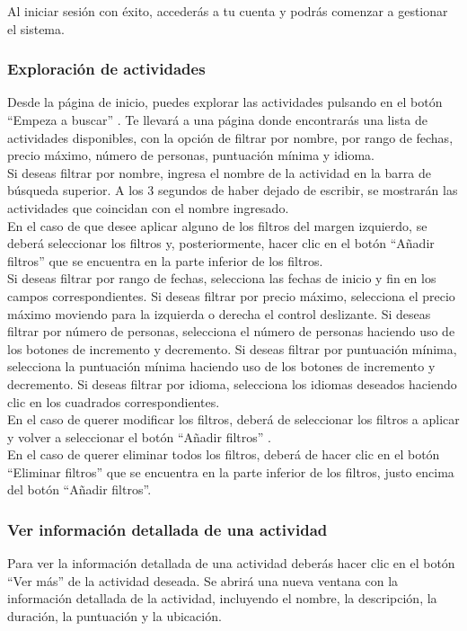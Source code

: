 Al iniciar sesión con éxito, accederás a tu cuenta y podrás comenzar a gestionar el sistema.

\subsubsection{Exploración de actividades}
Desde la página de inicio, puedes explorar las actividades pulsando en el botón “Empeza a buscar” . Te llevará a una página donde encontrarás una lista de actividades disponibles, con la opción de filtrar por nombre, por rango de fechas, precio máximo, número de personas, puntuación mínima y idioma.
\\[1ex]
Si deseas filtrar por nombre, ingresa el nombre de la actividad en la barra de búsqueda superior. A los 3 segundos de haber dejado de escribir, se mostrarán las actividades que coincidan con el nombre ingresado.
\\[1ex]
En el caso de que desee aplicar alguno de los filtros del margen izquierdo, se deberá seleccionar los filtros y, posteriormente, hacer clic en el botón “Añadir filtros” que se encuentra en la parte inferior de los filtros.
\\[1ex]
Si deseas filtrar por rango de fechas, selecciona las fechas de inicio y fin en los campos correspondientes.
Si deseas filtrar por precio máximo, selecciona el precio máximo moviendo para la izquierda o derecha el control deslizante.
Si deseas filtrar por número de personas, selecciona el número de personas haciendo uso de los botones de incremento y decremento.
Si deseas filtrar por puntuación mínima, selecciona la puntuación mínima haciendo uso de los botones de incremento y decremento.
Si deseas filtrar por idioma, selecciona los idiomas deseados haciendo clic en los cuadrados correspondientes.
\\[1ex]
En el caso de querer modificar los filtros, deberá de seleccionar los filtros a aplicar y volver a seleccionar el botón “Añadir filtros” .
\\[1ex]
En el caso de querer eliminar todos los filtros, deberá de hacer clic en el botón “Eliminar filtros” que se encuentra en la parte inferior de los filtros, justo encima del botón “Añadir filtros”.


\subsubsection{Ver información detallada de una actividad}
Para ver la información detallada de una actividad deberás hacer clic en el botón “Ver más” de la actividad deseada.
Se abrirá una nueva ventana con la información detallada de la actividad, incluyendo el nombre, la descripción, la duración, la puntuación y la ubicación.

